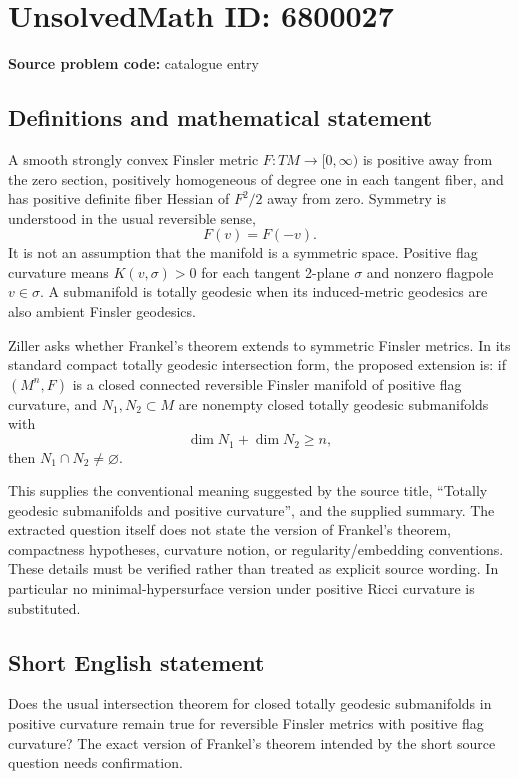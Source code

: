 \documentclass[11pt]{article}
\begin{document}
\section*{UnsolvedMath ID: 6800027}
\textbf{Source problem code:} catalogue entry
\subsection{Definitions and mathematical statement}
A smooth strongly convex Finsler metric \(F:TM\to[0,\infty)\) is positive away from the zero section, positively homogeneous of degree one in each tangent fiber, and has positive definite fiber Hessian of \(F^2/2\) away from zero. Symmetry is understood in the usual reversible sense,
\[
 F(v)=F(-v).
\]
It is not an assumption that the manifold is a symmetric space. Positive flag curvature means \(K(v,\sigma)>0\) for each tangent 2-plane \(\sigma\) and nonzero flagpole \(v\in\sigma\). A submanifold is totally geodesic when its induced-metric geodesics are also ambient Finsler geodesics.

Ziller asks whether Frankel's theorem extends to symmetric Finsler metrics. In its standard compact totally geodesic intersection form, the proposed extension is: if \((M^n,F)\) is a closed connected reversible Finsler manifold of positive flag curvature, and \(N_1,N_2\subset M\) are nonempty closed totally geodesic submanifolds with
\[
 \dim N_1+\dim N_2\geq n,
\]
then \(N_1\cap N_2\ne\varnothing\).

This supplies the conventional meaning suggested by the source title, ``Totally geodesic submanifolds and positive curvature'', and the supplied summary. The extracted question itself does not state the version of Frankel's theorem, compactness hypotheses, curvature notion, or regularity/embedding conventions. These details must be verified rather than treated as explicit source wording. In particular no minimal-hypersurface version under positive Ricci curvature is substituted.
\subsection{Short English statement}
Does the usual intersection theorem for closed totally geodesic submanifolds in positive curvature remain true for reversible Finsler metrics with positive flag curvature? The exact version of Frankel's theorem intended by the short source question needs confirmation.
\end{document}
